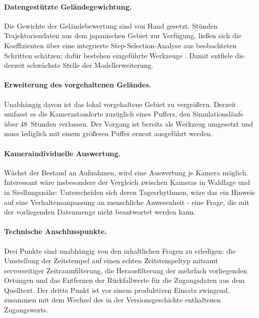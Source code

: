 \documentclass[12pt,a4paper]{report}
\begin{document}
\paragraph{Datengestützte Geländegewichtung.} Die Gewichte der Geländebewertung sind von Hand
gesetzt. Stünden Trajektoriendaten aus dem japanischen Gebiet zur Verfügung, ließen sich die
Koeffizienten über eine integrierte Step-Selection-Analyse \cite{Avgar2016} aus beobachteten
Schritten schätzen; dafür bestehen eingeführte Werkzeuge \cite{Signer2019}. Damit entfiele
die derzeit schwächste Stelle der Modellerweiterung.

\paragraph{Erweiterung des vorgehaltenen Geländes.} Unabhängig davon ist das lokal
vorgehaltene Gebiet zu vergrößern. Derzeit umfasst es die Kamerastandorte zuzüglich eines
Puffers, den Simulationsläufe über 48~Stunden verlassen. Der Vorgang ist bereits als Werkzeug
umgesetzt und muss lediglich mit einem größeren Puffer erneut ausgeführt werden.

\paragraph{Kameraindividuelle Auswertung.} Wächst der Bestand an Aufnahmen, wird eine
Auswertung je Kamera möglich. Interessant wäre insbesondere der Vergleich zwischen Kameras in
Waldlage und in Siedlungsnähe: Unterscheiden sich deren Tagesrhythmen, wäre das ein Hinweis
auf eine Verhaltensanpassung an menschliche Anwesenheit - eine Frage, die mit der
vorliegenden Datenmenge nicht beantwortet werden kann.

\paragraph{Technische Anschlusspunkte.} Drei Punkte sind unabhängig von den inhaltlichen
Fragen zu erledigen: die Umstellung der Zeitstempel auf einen echten Zeitstempeltyp mitsamt
serverseitiger Zeitraumfilterung, die Herausfilterung der mehrfach vorliegenden Ortungen und
das Entfernen der Rückfallwerte für die Zugangsdaten aus dem Quelltext. Der dritte Punkt ist
vor einem produktiven Einsatz zwingend, zusammen mit dem Wechsel des in der Versionsgeschichte
enthaltenen Zugangsworts.

\printbibliography[title={Literatur}]
\end{document}
